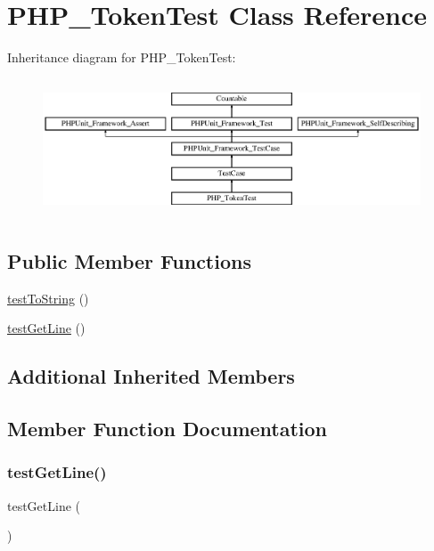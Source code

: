 \hypertarget{class_p_h_p___token_test}{}\section{P\+H\+P\+\_\+\+Token\+Test Class Reference}
\label{class_p_h_p___token_test}
Inheritance diagram for P\+H\+P\+\_\+\+Token\+Test\+:\begin{figure}[H]
\begin{center}
\leavevmode
\includegraphics[height=4.129793cm]{class_p_h_p___token_test}
\end{center}
\end{figure}
\subsection*{Public Member Functions}
\begin{DoxyCompactItemize}
\item 
\mbox{\hyperlink{class_p_h_p___token_test_ad0c45cf7077d1d6d8627e47de00e0374}{test\+To\+String}} ()
\item 
\mbox{\hyperlink{class_p_h_p___token_test_adec279f2d758882ab4b28cd8f77a6be1}{test\+Get\+Line}} ()
\end{DoxyCompactItemize}
\subsection*{Additional Inherited Members}


\subsection{Member Function Documentation}
\mbox{\label{class_p_h_p___token_test_adec279f2d758882ab4b28cd8f77a6be1}} 
\subsubsection{\texorpdfstring{test\+Get\+Line()}{testGetLine()}}
{\footnotesize\ttfamily test\+Get\+Line (\begin{DoxyParamCaption}{ }\end{DoxyParamCaption})}


